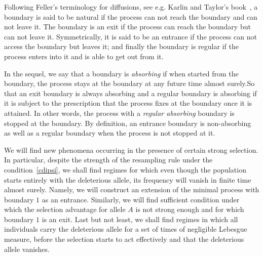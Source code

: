\documentclass[AHL,Unicode,longabstracts,published]{cedram}
\begin{document}
Following Feller's terminology for diffusions, see e.g. Karlin and Taylor's book~\cite[Chapter~15, Section~6]{MR611513}, a boundary is said to be natural if the process can not reach the boundary and can not leave it. The boundary is an exit if the process can reach the boundary but can not leave it. Symmetrically, it is said to be an entrance if the process can not access the boundary but leaves it; and finally the boundary is regular if the process enters into it and is able to get out from it.

In the sequel, we say that a boundary is \emph{absorbing} if when started from the boundary, the process stays at the boundary at any future time almost surely.\linebreak So that an exit boundary is always absorbing and a regular boundary is absorbing if it is subject to the prescription that the process fixes at the boundary once it is attained. In other words, the process with a \emph{regular absorbing} boundary is stopped at the boundary. By definition, an entrance boundary is non-absorbing as well as a regular boundary when the process is not stopped at it.

We will find new phenomena occurring in the presence of certain strong selection. In particular, despite the strength of the resampling rule under the condition~\eqref{cdipsi}, we shall find regimes for which even though the population starts entirely with the deleterious allele, its frequency will vanish in finite time almost surely. Namely, we will construct an extension of the minimal process with boundary $1$ as an entrance. Similarly, we will find sufficient condition under which the selection advantage for allele $A$ is not strong enough and for which boundary $1$ is an exit. Last but not least, we shall find regimes in which all individuals carry the deleterious allele for a set of times of negligible Lebesgue measure, before the selection starts to act effectively and that the deleterious allele vanishes.
\end{document}
